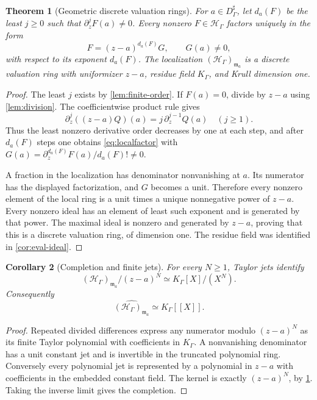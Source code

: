 \documentclass[11pt,letterpaper]{article}
\numberwithin{equation}{section}
\newtheorem{theorem}{Theorem}[section]
\newtheorem{corollary}[theorem]{Corollary}
\theoremstyle{definition}
\theoremstyle{remark}
\newcommand{\HH}{\mathcal H}
\newcommand{\mm}{\mathfrak m}
\begin{document}
\begin{theorem}[Geometric discrete valuation rings]\label{thm:dvr}
For $a\in D^\sharp_\Gamma$, let $d_a(F)$ be the least $j\ge0$ such that
$\partial_z^jF(a)\ne0$. Every nonzero $F\in\HH_\Gamma$ factors uniquely
in the form
\begin{equation}\label{eq:localfactor}
 F=(z-a)^{d_a(F)}G,\qquad G(a)\ne0,
\end{equation}
with respect to its exponent $d_a(F)$. The localization
$(\HH_\Gamma)_{\mm_a}$ is a discrete valuation ring with uniformizer
$z-a$, residue field $K_\Gamma$, and Krull dimension one.
\end{theorem}
\begin{proof}
The least $j$ exists by \cref{lem:finite-order}. If $F(a)=0$, divide by
$z-a$ using \cref{lem:division}. The coefficientwise product rule gives
\[
 \partial_z^j((z-a)Q)(a)=j\,\partial_z^{j-1}Q(a)\quad(j\ge1).
\]
Thus the least nonzero derivative order decreases by one at each
step, and after $d_a(F)$ steps one obtains \eqref{eq:localfactor} with
$G(a)=\partial_z^{d_a(F)}F(a)/d_a(F)!\ne0$.

A fraction in the localization has denominator nonvanishing at $a$.
Its numerator has the displayed factorization, and $G$ becomes a unit.
Therefore every nonzero element of the local ring is a unit times a
unique nonnegative power of $z-a$. Every nonzero ideal has an element
of least such exponent and is generated by that power. The maximal
ideal is nonzero and generated by $z-a$, proving that this is a discrete
valuation ring, of dimension one. The residue field was identified in
\cref{cor:eval-ideal}.
\end{proof}

\begin{corollary}[Completion and finite jets]\label{cor:completion}
For every $N\ge1$, Taylor jets identify
\[
 (\HH_\Gamma)_{\mm_a}/(z-a)^N
       \simeq K_\Gamma[X]/(X^N).
\]
Consequently
\[
 \widehat{(\HH_\Gamma)_{\mm_a}}\simeq K_\Gamma[[X]].
\]
\end{corollary}
\begin{proof}
Repeated divided differences express any numerator modulo $(z-a)^N$ as
its finite Taylor polynomial with coefficients in $K_\Gamma$. A
nonvanishing denominator has a unit constant jet and is invertible in
the truncated polynomial ring. Conversely every polynomial jet is
represented by a polynomial in $z-a$ with coefficients in the embedded
constant field. The kernel is exactly $(z-a)^N$, by
\cref{thm:dvr}. Taking the inverse limit gives the completion.
\end{proof}
\end{document}
